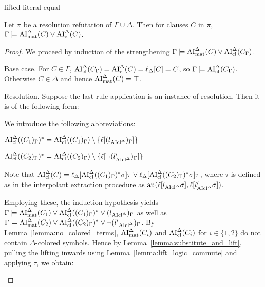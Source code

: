 \documentclass[,%
	draft=false,%
	numbers=noendperiod
	oneside,openany
	a4paper,
	11pt,
]{memoir}
\begin{document}
\begin{lemma}
	\label{lemma:lifted_literal_equal}
	lifted literal equal
\end{lemma}


\begin{lemma}
	Let $\pi$ be a resolution refutation of $\Gamma\cup\Delta$.
	Then for clauses $C$ in $\pi$,
	$\Gamma\entails\nolinebreak \AImatde(C) \lor\nolinebreak \AIclde(C)$.
\end{lemma}
\begin{proof}
	We proceed by induction of the strengthening $\Gamma\models \operatorname{AI}_\mathrm{mat}^\Delta(C) \lor \operatorname{AI}_\mathrm{cl}^\Delta(C_\Gamma)$\footnotemark.

	\begin{description}
		\item{Base case.}
			For $C\in \Gamma$, $\operatorname{AI}_\mathrm{cl}^\Delta(C_\Gamma) = \operatorname{AI}_\mathrm{cl}^\Delta(C) = \ell_{\Delta}[C] = C$, so $\Gamma \models \operatorname{AI}_\mathrm{cl}^\Delta(C_\Gamma)$.
			Otherwise $C \in \Delta$ and hence $\operatorname{AI}_\mathrm{mat}^\Delta(C) = \top$.

		\item{Resolution.}
			Suppose the last rule application is an instance of resolution. Then it is of the following form:
			\begin{prooftree}
			\end{prooftree}
			We introduce the following abbreviations:

			\newcommand{\clauseOnePrime}{\AIclausede((C_1)_\Gamma)^*}
			\newcommand{\clauseTwoPrime}{\AIclausede((C_2)_\Gamma)^*}

			$ \clauseOnePrime = \AIclausede((C_1)_\Gamma) \setminus \{\lifboth{(l{\fromclausede})_\Gamma}\}$

			$ \clauseTwoPrime = \AIclausede((C_2)_\Gamma)\setminus \{\lifboth{\lnot (l{\fromclausede'})_\Gamma}\}$

			Note that $\AIclde(C) = \lifdeltanovar{ \clauseOnePrime\sigma} \tau \lor \lifdeltanovar{ \clauseTwoPrime\sigma} \tau$, where $\tau$ is defined as in the interpolant extraction procedure as
			$\operatorname{au} ( \ell[ l_{\operatorname{AIcl}^\Delta} \sigma], \ell[ l'_{\operatorname{AIcl}^\Delta} \sigma] )$.

			Employing these, the induction hypothesis yields 
			$\Gamma \entails \AImatrixde(C_1) \lor \clauseOnePrime \lor {(l{\fromclausede})_\Gamma}$
			as well as
			$\Gamma \entails \AImatrixde(C_2) \lor \clauseTwoPrime \lor {\lnot (l'{\fromclausede})_\Gamma}$.
			By Lemma~\ref{lemma:no_colored_terms}, $\operatorname{AI}_\mathrm{mat}^\Delta(C_i)$ and $\operatorname{AI}_\mathrm{cl}^\Delta(C_i)$ for $i\in\{1,2\}$ do not contain $\Delta$-colored symbols.
			Hence by Lemma~\ref{lemma:substitute_and_lift}, pulling the lifting inwards using Lemma~\ref{lemma:lift_logic_commute} and applying $\tau$, we obtain:


\end{description}
\end{proof}
\end{document}
